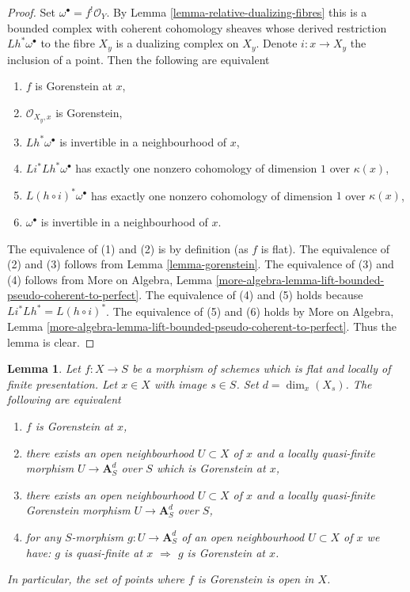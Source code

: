 \documentclass{stacks-project}
\theoremstyle{plain}
\newtheorem{lemma}[subsection]{Lemma}
\theoremstyle{definition}
\theoremstyle{remark}
\numberwithin{equation}{subsection}
\begin{document}
\begin{proof}
Set $\omega^\bullet = f^!\mathcal{O}_Y$. By
Lemma \ref{lemma-relative-dualizing-fibres}
this is a bounded complex with coherent cohomology
sheaves whose derived restriction $Lh^*\omega^\bullet$
to the fibre $X_y$ is a dualizing complex on $X_y$.
Denote $i : x \to X_y$ the inclusion of a point.
Then the following are equivalent
\begin{enumerate}
\item $f$ is Gorenstein at $x$,
\item $\mathcal{O}_{X_y, x}$ is Gorenstein,
\item $Lh^*\omega^\bullet$ is invertible in a neighbourhood of $x$,
\item $Li^* Lh^* \omega^\bullet$ has exactly one nonzero
cohomology of dimension $1$ over $\kappa(x)$,
\item $L(h \circ i)^* \omega^\bullet$ has exactly one nonzero
cohomology of dimension $1$ over $\kappa(x)$,
\item $\omega^\bullet$ is invertible in a neighbourhood of $x$.
\end{enumerate}
The equivalence of (1) and (2) is by definition (as $f$ is flat).
The equivalence of (2) and (3) follows from
Lemma \ref{lemma-gorenstein}.
The equivalence of (3) and (4) follows from
More on Algebra, Lemma
\ref{more-algebra-lemma-lift-bounded-pseudo-coherent-to-perfect}.
The equivalence of (4) and (5) holds because
$Li^* Lh^* = L(h \circ i)^*$.
The equivalence of (5) and (6) holds by
More on Algebra, Lemma
\ref{more-algebra-lemma-lift-bounded-pseudo-coherent-to-perfect}.
Thus the lemma is clear.
\end{proof}

\begin{lemma}
\label{lemma-flat-finite-presentation-characterize-gorenstein}
Let $f : X \to S$ be a morphism of schemes which is flat and locally
of finite presentation. Let $x \in X$ with image $s \in S$.
Set $d = \dim_x(X_s)$. The following are equivalent
\begin{enumerate}
\item $f$ is Gorenstein at $x$,
\item there exists an open neighbourhood $U \subset X$ of $x$
and a locally quasi-finite morphism $U \to \mathbf{A}^d_S$ over $S$
which is Gorenstein at $x$,
\item there exists an open neighbourhood $U \subset X$ of $x$
and a locally quasi-finite Gorenstein morphism $U \to \mathbf{A}^d_S$ over $S$,
\item for any $S$-morphism $g : U \to \mathbf{A}^d_S$
of an open neighbourhood $U \subset X$ of $x$ we have:
$g$ is quasi-finite at $x$ $\Rightarrow$ $g$ is Gorenstein at $x$.
\end{enumerate}
In particular, the set of points where $f$ is Gorenstein is open in $X$.
\end{lemma}
\end{document}
